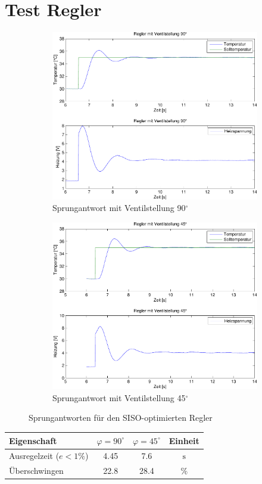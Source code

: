 \section{Test Regler}
\begin{figure}[h!]
	\centering
	\begin{subfigure}{0.475\textwidth}
		\includegraphics[width=1\textwidth]{09/pi_siso_full_plot.pdf}
		\caption{Sprungantwort mit Ventilstellung 90$^\circ$}
		\label{fig:09a}
    	\end{subfigure}
	\hfill{}
	\begin{subfigure}{0.475\textwidth}
		\includegraphics[width=1\textwidth]{09/pi_siso_half_plot.pdf}
		\caption{Sprungantwort mit Ventilstellung 45$^\circ$}
		\label{fig:09b}
	\end{subfigure}
	\caption{Sprungantworten für den SISO-optimierten Regler}
\end{figure}

\begin{table}[h!]
	\centering
	\begin{tabular}{l c c c}
		Eigenschaft
			& $\varphi = 90^\circ$
			& $\varphi = 45^\circ$ 
			& Einheit\\
		\hline
		Ausregelzeit ($e < 1\%$)
			& 4.45
			& 7.6
            & $\si{\second}$ \\
		Überschwingen
			& 22.8
			& 28.4
			& $\%$
	\end{tabular}
\end{table}
